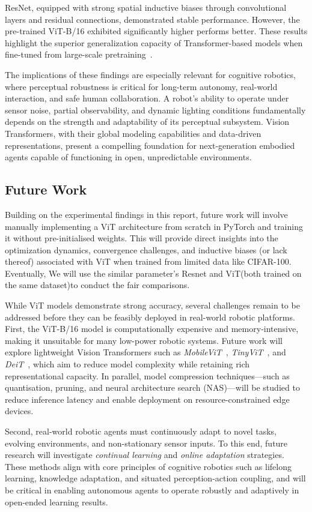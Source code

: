 \documentclass[conference]{IEEEtran}
\begin{document}
ResNet, equipped with strong spatial inductive biases through convolutional layers and residual connections, demonstrated stable performance. However, the pre-trained ViT-B/16 exhibited significantly higher performs better. These results highlight the superior generalization capacity of Transformer-based models when fine-tuned from large-scale pretraining~\cite{mauricio2023comparing}.

The implications of these findings are especially relevant for cognitive robotics, where perceptual robustness is critical for long-term autonomy, real-world interaction, and safe human collaboration. A robot’s ability to operate under sensor noise, partial observability, and dynamic lighting conditions fundamentally depends on the strength and adaptability of its perceptual subsystem. Vision Transformers, with their global modeling capabilities and data-driven representations, present a compelling foundation for next-generation embodied agents capable of functioning in open, unpredictable environments.

\subsection{Future Work}
Building on the experimental findings in this report, future work will involve manually implementing a ViT architecture from scratch in PyTorch and training it without pre-initialised weights. This will provide direct insights into the optimization dynamics, convergence challenges, and inductive biases (or lack thereof) associated with ViT when trained from limited data like CIFAR-100. Eventually, We will use the similar parameter's Resnet and ViT(both trained on the same dataset)to conduct the fair comparisons.

While ViT models demonstrate strong accuracy, several challenges remain to be addressed before they can be feasibly deployed in real-world robotic platforms. First, the ViT-B/16 model is computationally expensive and memory-intensive, making it unsuitable for many low-power robotic systems. Future work will explore lightweight Vision Transformers such as \textit{MobileViT}~\cite{mehta2021mobilevit}, \textit{TinyViT}~\cite{wu2022tinyvit}, and \textit{DeiT}~\cite{touvron2021training}, which aim to reduce model complexity while retaining rich representational capacity. In parallel, model compression techniques—such as quantisation, pruning, and neural architecture search (NAS)—will be studied to reduce inference latency and enable deployment on resource-constrained edge devices.

Second, real-world robotic agents must continuously adapt to novel tasks, evolving environments, and non-stationary sensor inputs. To this end, future research will investigate \textit{continual learning} and \textit{online adaptation} strategies. These methods align with core principles of cognitive robotics such as lifelong learning, knowledge adaptation, and situated perception-action coupling, and will be critical in enabling autonomous agents to operate robustly and adaptively in open-ended learning results.

\newpage


\end{document}
